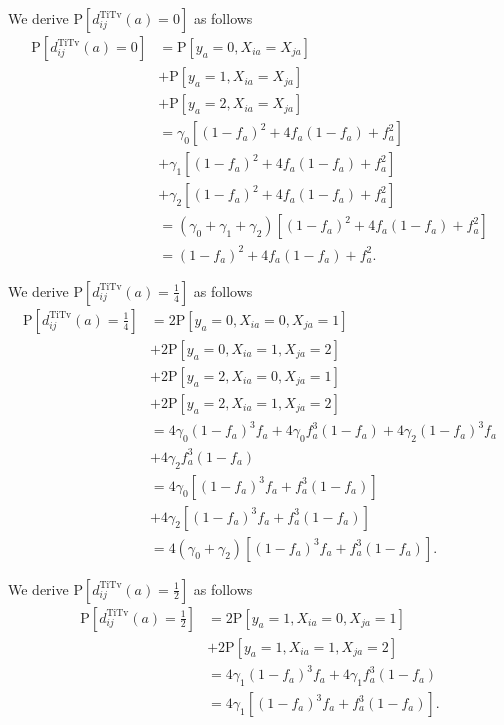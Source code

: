 \documentclass[10pt,letterpaper]{article}\usepackage[]{graphicx}\usepackage[]{color}
\begin{document}
We derive $\text{P}\left[d^\text{TiTv}_{ij}(a) = 0\right]$ as follows
%
\begin{equation}\label{eq:prob_TiTv_0}
\begin{aligned}
\text{P}\left[d^\text{TiTv}_{ij}(a) = 0\right] &= \text{P}\left[y_a = 0, X_{ia} = X_{ja}\right] \\
&+ \text{P}\left[y_a = 1, X_{ia} = X_{ja}\right] \\
&+ \text{P}\left[y_a = 2, X_{ia} = X_{ja}\right] \\
&= \gamma_0 \left[(1 - f_a)^2 + 4 f_a (1 - f_a) + f^2_a\right] \\
&+ \gamma_1 \left[(1 - f_a)^2 + 4 f_a (1 - f_a) + f^2_a\right] \\
&+ \gamma_2 \left[(1 - f_a)^2 + 4 f_a (1 - f_a) + f^2_a\right] \\
&= (\gamma_0 + \gamma_1 + \gamma_2)\left[(1 - f_a)^2 + 4 f_a (1 - f_a) + f^2_a\right] \\
&= (1 - f_a)^2 + 4 f_a (1 - f_a) + f^2_a.
\end{aligned}
\end{equation}

We derive $\text{P}\left[d^\text{TiTv}_{ij}(a) = \frac{1}{4}\right]$ as follows
%
\begin{equation}\label{eq:prob_TiTv_0.25}
\begin{aligned}
\text{P}\left[d^\text{TiTv}_{ij}(a) = \frac{1}{4}\right] &= 2 \text{P}\left[y_a = 0, X_{ia} = 0, X_{ja} = 1\right] \\
&+ 2 \text{P}\left[y_a = 0, X_{ia} = 1, X_{ja} = 2\right] \\
&+ 2 \text{P}\left[y_a = 2, X_{ia} = 0, X_{ja} = 1\right] \\
&+ 2 \text{P}\left[y_a = 2, X_{ia} = 1, X_{ja} = 2\right] \\
&= 4 \gamma_0 (1 - f_a)^3 f_a + 4 \gamma_0 f^3_a (1 - f_a) + 4 \gamma_2 (1 - f_a)^3 f_a \\
&+ 4 \gamma_2 f^3_a (1 - f_a) \\
&= 4 \gamma_0 \left[(1 - f_a)^3 f_a + f^3_a (1 - f_a)\right] \\
&+ 4 \gamma_2 \left[(1 - f_a)^3 f_a + f^3_a (1 - f_a)\right] \\
&= 4(\gamma_0 + \gamma_2)\left[(1 - f_a)^3 f_a + f^3_a (1 - f_a)\right].
\end{aligned}
\end{equation}

We derive $\text{P}\left[d^\text{TiTv}_{ij}(a) = \frac{1}{2}\right]$ as follows
%
\begin{equation}\label{eq:prob_TiTv_0.5}
\begin{aligned}
\text{P}\left[d^\text{TiTv}_{ij}(a) = \frac{1}{2}\right] &= 2 \text{P}\left[y_a = 1, X_{ia} = 0, X_{ja} = 1\right] \\
&+ 2 \text{P}\left[y_a = 1, X_{ia} = 1, X_{ja} = 2\right] \\
&= 4 \gamma_1 (1 - f_a)^3 f_a + 4 \gamma_1 f^3_a (1 - f_a) \\
&= 4 \gamma_1 \left[(1 - f_a)^3 f_a + f^3_a (1 - f_a)\right].
\end{aligned}
\end{equation}
\end{document}
